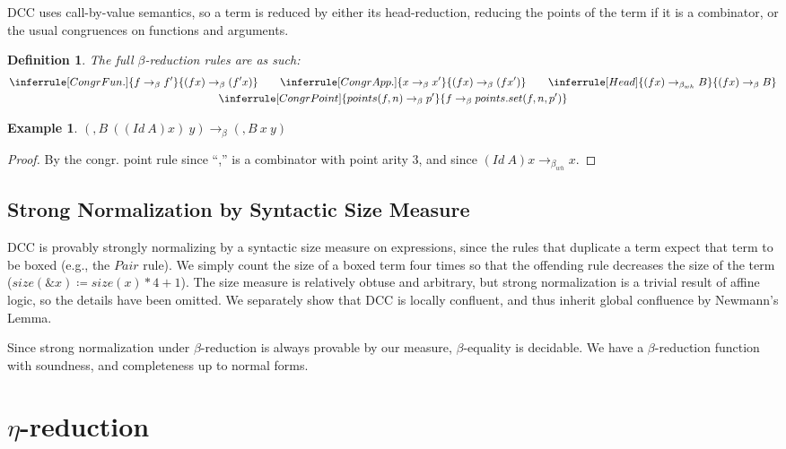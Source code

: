 \documentclass{article}
\newtheorem{definition}{Definition}
\newtheorem{example}{Example}
\newcommand{\arr}{\rightarrow}
\newcommand{\barr}{\arr_{\beta}}
\newcommand{\barrh}{\arr_{\beta_{wh}}}
\begin{document}
DCC uses call-by-value semantics, so a term is reduced by either its head-reduction, reducing the points of the term if it is a combinator, or the usual congruences on functions and arguments.

\begin{definition}
  The full \(\beta\)-reduction rules are as such:
  \begin{gather*}
  \inferrule[Congr Fun.]
  { f \barr f'}
  { (f x) \barr (f' x)}\qquad
  \inferrule[Congr App.]
  { x \barr x'}
  { (f x) \barr (f x')}\qquad
  \inferrule[Head]
  { (f x) \barrh B}
  { (f x) \barr B}\\
  \inferrule[Congr Point]
  { points(f, n) \barr p'}
  { f \barr points.set(f, n, p')}
  \end{gather*}
\end{definition}

\begin{example}
  \((,B\ ((Id\ A) x)\ y) \barr (,B\ x\ y)\)
\end{example}

\begin{proof}
  By the congr. point rule since ``,'' is a combinator with point arity 3, and since \((Id\ A) x \barrh x\).
\end{proof}

\subsection{Strong Normalization by Syntactic Size Measure}

DCC is provably strongly normalizing by a syntactic size measure on expressions, since the rules that duplicate a term expect that term to be boxed (e.g., the \(Pair\) rule). We simply count the size of a boxed term four times so that the offending rule decreases the size of the term (\(size(\& x) \coloneq size(x) * 4 + 1\)). The size measure is relatively obtuse and arbitrary, but strong normalization is a trivial result of affine logic, so the details have been omitted. We separately show that DCC is locally confluent, and thus inherit global confluence by Newmann's Lemma.

Since strong normalization under \(\beta\)-reduction is always provable by our measure, \(\beta\)-equality is decidable. We have a \(\beta\)-reduction function with soundness, and completeness up to normal forms.

\section{\(\eta\)-reduction}
\end{document}
